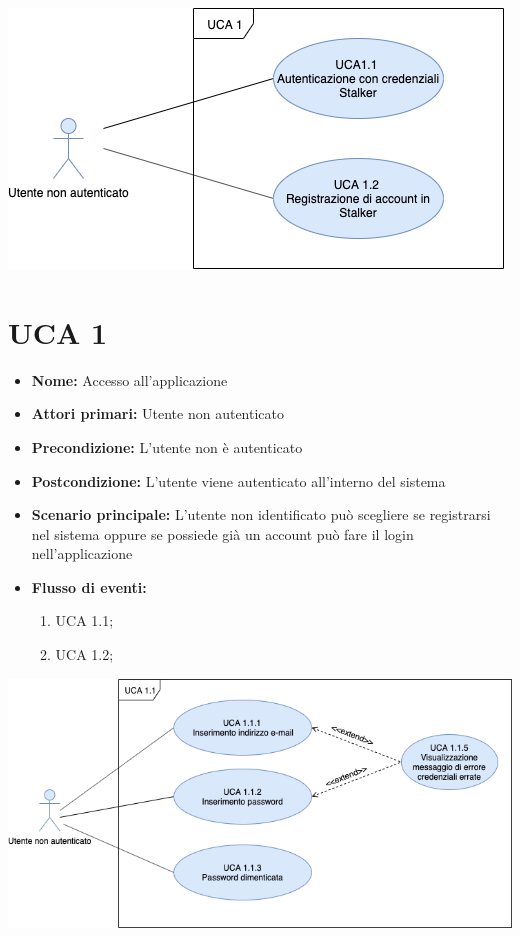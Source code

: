 

\includegraphics[scale=0.8]{sezioni/UseCase/Immagini/Panoramica.png}
\section{UCA  1}%
\begin{itemize}
\item \textbf{Nome:} Accesso all'applicazione
\item \textbf{Attori primari:} Utente non autenticato
\item \textbf{Precondizione:} L’utente non è autenticato
\item \textbf{Postcondizione:} L’utente viene autenticato all’interno del sistema 
\item \textbf{Scenario principale:} L'utente non identificato può scegliere se registrarsi nel sistema oppure se possiede già un account può fare il login nell'applicazione %
\item \textbf{Flusso di eventi:}
    \begin{enumerate}
        \item UCA 1.1;
        \item UCA 1.2;
    \end{enumerate}

\end{itemize}

\newpage
\includegraphics[scale=0.4]{sezioni/UseCase/Immagini/Login.png}
